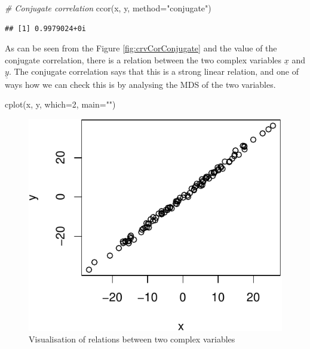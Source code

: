 \documentclass[
]{book}
\newenvironment{Shaded}{\begin{snugshade}}{\end{snugshade}}
\newcommand{\AttributeTok}[1]{\textcolor[rgb]{0.77,0.63,0.00}{#1}}
\newcommand{\CommentTok}[1]{\textcolor[rgb]{0.56,0.35,0.01}{\textit{#1}}}
\newcommand{\DecValTok}[1]{\textcolor[rgb]{0.00,0.00,0.81}{#1}}
\newcommand{\FunctionTok}[1]{\textcolor[rgb]{0.00,0.00,0.00}{#1}}
\newcommand{\NormalTok}[1]{#1}
\newcommand{\StringTok}[1]{\textcolor[rgb]{0.31,0.60,0.02}{#1}}
\begin{document}
\begin{Shaded}
\begin{Highlighting}[]
\CommentTok{\# Conjugate correlation}
\FunctionTok{ccor}\NormalTok{(x, y, }\AttributeTok{method=}\StringTok{"conjugate"}\NormalTok{)}
\end{Highlighting}
\end{Shaded}

\begin{verbatim}
## [1] 0.9979024+0i
\end{verbatim}

As can be seen from the Figure \ref{fig:crvCorConjugate} and the value of the conjugate correlation, there is a relation between the two complex variables \(\underline{x}\) and \(\underline{y}\). The conjugate correlation says that this is a strong linear relation, and one of ways how we can check this is by analysing the MDS of the two variables.

\begin{Shaded}
\begin{Highlighting}[]
\FunctionTok{cplot}\NormalTok{(x, y, }\AttributeTok{which=}\DecValTok{2}\NormalTok{, }\AttributeTok{main=}\StringTok{""}\NormalTok{)}
\end{Highlighting}
\end{Shaded}

\begin{figure}
\centering
\includegraphics{Svetunkov---Svetunkov---Complex-Dynamic-Models_files/figure-latex/crvCorConjugateMDS-1.pdf}
\caption{\label{fig:crvCorConjugateMDS}Visualisation of relations between two complex variables}
\end{figure}
\end{document}
